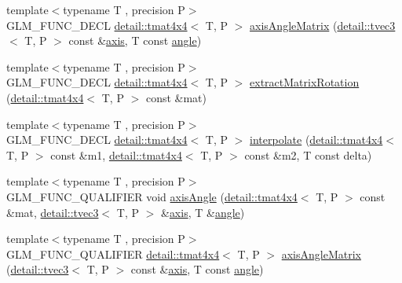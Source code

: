 \begin{DoxyCompactItemize}
\item 
{\footnotesize template$<$typename T , precision P$>$ }\\G\+L\+M\+\_\+\+F\+U\+N\+C\+\_\+\+D\+E\+CL \hyperlink{structglm_1_1detail_1_1tmat4x4}{detail\+::tmat4x4}$<$ T, P $>$ \hyperlink{group__gtx__matrix__interpolation_gafc6982aa7c8e8198b21f038f51fc4b90}{axis\+Angle\+Matrix} (\hyperlink{structglm_1_1detail_1_1tvec3}{detail\+::tvec3}$<$ T, P $>$ const \&\hyperlink{group__gtc__quaternion_ga8eef9f8c3f2e4836dccf09df975b20fb}{axis}, T const \hyperlink{group__gtc__quaternion_ga23a3fc7ada5bbb665ff84c92c6e0542c}{angle})
\item 
{\footnotesize template$<$typename T , precision P$>$ }\\G\+L\+M\+\_\+\+F\+U\+N\+C\+\_\+\+D\+E\+CL \hyperlink{structglm_1_1detail_1_1tmat4x4}{detail\+::tmat4x4}$<$ T, P $>$ \hyperlink{group__gtx__matrix__interpolation_gacb1e3e76c1710d89a1852d87d58c021e}{extract\+Matrix\+Rotation} (\hyperlink{structglm_1_1detail_1_1tmat4x4}{detail\+::tmat4x4}$<$ T, P $>$ const \&mat)
\item 
{\footnotesize template$<$typename T , precision P$>$ }\\G\+L\+M\+\_\+\+F\+U\+N\+C\+\_\+\+D\+E\+CL \hyperlink{structglm_1_1detail_1_1tmat4x4}{detail\+::tmat4x4}$<$ T, P $>$ \hyperlink{group__gtx__matrix__interpolation_gad7dbb702234767be1b4d3c191a2327ac}{interpolate} (\hyperlink{structglm_1_1detail_1_1tmat4x4}{detail\+::tmat4x4}$<$ T, P $>$ const \&m1, \hyperlink{structglm_1_1detail_1_1tmat4x4}{detail\+::tmat4x4}$<$ T, P $>$ const \&m2, T const delta)
\item 
{\footnotesize template$<$typename T , precision P$>$ }\\G\+L\+M\+\_\+\+F\+U\+N\+C\+\_\+\+Q\+U\+A\+L\+I\+F\+I\+ER void \hyperlink{group__gtx__matrix__interpolation_gadf049332345bf754b63fe24a914f8fac}{axis\+Angle} (\hyperlink{structglm_1_1detail_1_1tmat4x4}{detail\+::tmat4x4}$<$ T, P $>$ const \&mat, \hyperlink{structglm_1_1detail_1_1tvec3}{detail\+::tvec3}$<$ T, P $>$ \&\hyperlink{group__gtc__quaternion_ga8eef9f8c3f2e4836dccf09df975b20fb}{axis}, T \&\hyperlink{group__gtc__quaternion_ga23a3fc7ada5bbb665ff84c92c6e0542c}{angle})
\item 
{\footnotesize template$<$typename T , precision P$>$ }\\G\+L\+M\+\_\+\+F\+U\+N\+C\+\_\+\+Q\+U\+A\+L\+I\+F\+I\+ER \hyperlink{structglm_1_1detail_1_1tmat4x4}{detail\+::tmat4x4}$<$ T, P $>$ \hyperlink{group__gtx__matrix__interpolation_gafc6982aa7c8e8198b21f038f51fc4b90}{axis\+Angle\+Matrix} (\hyperlink{structglm_1_1detail_1_1tvec3}{detail\+::tvec3}$<$ T, P $>$ const \&\hyperlink{group__gtc__quaternion_ga8eef9f8c3f2e4836dccf09df975b20fb}{axis}, T const \hyperlink{group__gtc__quaternion_ga23a3fc7ada5bbb665ff84c92c6e0542c}{angle})

\end{DoxyCompactItemize}
